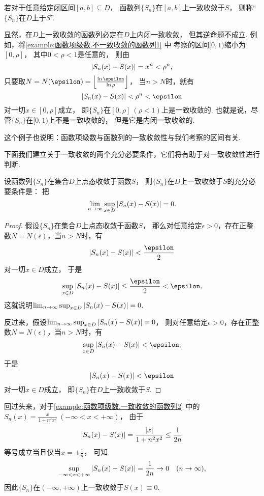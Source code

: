 \begin{definition}
若对于任意给定闭区间\([a,b] \subseteq D\)，
函数列\(\{S_n\}\)在\([a,b]\)上一致收敛于\(S\)，
则称“\(\{S_n\}\)在\(D\)上于\(S\)”.
\end{definition}
显然，在\(D\)上一致收敛的函数列必定在\(D\)上内闭一致收敛，
但其逆命题不成立.
例如，将\cref{example:函数项级数.不一致收敛的函数列1} 中
考察的区间\([0,1)\)缩小为\([0,\rho]\)，
其中\(0<\rho<1\)是任意的，
则由\[
	\abs{S_n(x) - S(x)} = x^n < \rho^n,
\]
只要取\(N = N(\epsilon) = \floor*{\frac{\ln\epsilon}{\ln\rho}}\)，
当\(n>N\)时，就有\[
	\abs{S_n(x) - S(x)} < \rho^n < \epsilon
\]对一切\(x\in[0,\rho]\)成立，
即\(\{S_n\}\)在\([0,\rho]\ (\rho<1)\)上是一致收敛的.
也就是说，尽管\(\{S_n\}\)在\([0,1)\)上不是一致收敛的，
但是它是内闭一致收敛的.

这个例子也说明：函数项级数与函数列的一致收敛性与我们考察的区间有关.

下面我们建立关于一致收敛的两个充分必要条件，它们将有助于对一致收敛性进行判断.
\begin{theorem}\label{theorem:函数项级数.一致收敛的充分必要条件1}
设函数列\(\{S_n\}\)在集合\(D\)上点态收敛于函数\(S\)，
则\(\{S_n\}\)在\(D\)上一致收敛于\(S\)的充分必要条件是：
把\[
	\lim_{n\to\infty} \sup_{x \in D} \abs{S_n(x) - S(x)} = 0.
\]
\begin{proof}
假设\(\{S_n\}\)在集合\(D\)上点态收敛于函数\(S\)，
那么对任意给定\(\epsilon>0\)，存在正整数\(N = N(\epsilon)\)，当\(n>N\)时，有\[
	\abs{S_n(x) - S(x)} < \frac\epsilon2
\]对一切\(x \in D\)成立，
于是\[
	\sup_{x \in D} \abs{S_n(x) - S(x)} \leq \frac\epsilon2 < \epsilon,
\]
这就说明\(\lim_{n\to\infty} \sup_{x \in D} \abs{S_n(x) - S(x)} = 0\).

反过来，假设\(\lim_{n\to\infty} \sup_{x \in D} \abs{S_n(x) - S(x)} = 0\)，
则对任意给定\(\epsilon>0\)，存在正整数\(N = N(\epsilon)\)，当\(n>N\)时，有\[
	\sup_{x \in D} \abs{S_n(x) - S(x)} < \epsilon,
\]
于是\[
	\abs{S_n(x) - S(x)} < \epsilon
\]对一切\(x \in D\)成立，
即\(\{S_n\}\)在\(D\)上一致收敛于\(S\).
\end{proof}
\end{theorem}
回过头来，对于\cref{example:函数项级数.一致收敛的函数列2} 中的
\(S_n(x) = \frac{x}{1+n^2x^2}\ (-\infty < x < +\infty)\)，
由于\[
	\abs{S_n(x) - S(x)}
	= \frac{\abs{x}}{1+n^2x^2}
	\leq \frac1{2n}
\]等号成立当且仅当\(x=\pm\frac1n\)，
可知\[
	\sup_{-\infty < x < +\infty} \abs{S_n(x) - S(x)}
	= \frac1{2n}
	\to 0
	\quad(n\to\infty),
\]
因此\(\{S_n\}\)在\((-\infty,+\infty)\)上一致收敛于\(S(x)\equiv0\).

